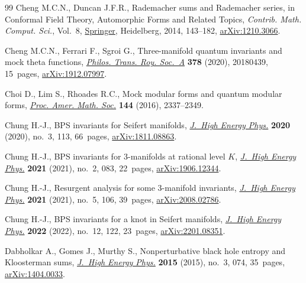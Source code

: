 \documentclass[pdftex]{sigma}
\theoremstyle{definition}
\numberwithin{equation}{section}
\begin{document}
\begin{thebibliography}{99}
Cheng M.C.N., Duncan J.F.R., Rademacher sums and {R}ademacher series, in
 Conformal {F}ield {T}heory, {A}utomorphic {F}orms and {R}elated {T}opics,
 \textit{Contrib. Math. Comput. Sci.}, Vol.~8, \href{https://doi.org/10.1007/978-3-662-43831-2_6}{Springer}, Heidelberg, 2014,
 143--182, \href{https://arxiv.org/abs/#2}{arXiv:1210.3066}.

Cheng M.C.N., Ferrari F., Sgroi G., Three-manifold quantum invariants and mock
 theta functions, \href{https://doi.org/10.1098/rsta.2018.0439}{\textit{Philos. Trans. Roy. Soc.~A}} \textbf{378} (2020),
 20180439, 15~pages, \href{https://arxiv.org/abs/1912.07997}{arXiv:1912.07997}.

Choi D., Lim S., Rhoades R.C., Mock modular forms and quantum modular forms,
 \href{https://doi.org/10.1090/proc/12907}{\textit{Proc. Amer. Math. Soc.}} \textbf{144} (2016), 2337--2349.

Chung H.-J., B{PS} invariants for {S}eifert manifolds, \href{https://doi.org/10.1007/jhep03(2020)113}{\textit{J.~High Energy
 Phys.}} \textbf{2020} (2020), no.~3, 113, 66~pages, \href{https://arxiv.org/abs/1811.08863}{arXiv:1811.08863}.

Chung H.-J., B{PS} invariants for 3-manifolds at rational level {$K$},
 \href{https://doi.org/10.1007/jhep02(2021)083}{\textit{J.~High Energy Phys.}} \textbf{2021} (2021), no.~2, 083, 22~pages,
 \href{https://arxiv.org/abs/1906.12344}{arXiv:1906.12344}.

Chung H.-J., Resurgent analysis for some 3-manifold invariants, \href{https://doi.org/10.1007/jhep05(2021)106}{\textit{J.~High
 Energy Phys.}} \textbf{2021} (2021), no.~5, 106, 39~pages,
 \href{https://arxiv.org/abs/2008.02786}{arXiv:2008.02786}.

Chung H.-J., B{PS} invariants for a knot in {S}eifert manifolds, \href{https://doi.org/10.1007/jhep12(2022)122}{\textit{J.~High
 Energy Phys.}} \textbf{2022} (2022), no.~12, 122, 23~pages,
 \href{https://arxiv.org/abs/2201.08351}{arXiv:2201.08351}.

Dabholkar A., Gomes J., Murthy S., Nonperturbative black hole entropy and
 {K}loosterman sums, \href{https://doi.org/10.1007/JHEP03(2015)074}{\textit{J.~High Energy Phys.}} \textbf{2015} (2015),
 no.~3, 074, 35~pages, \href{https://arxiv.org/abs/1404.0033}{arXiv:1404.0033}.


\end{thebibliography}
\end{document}
